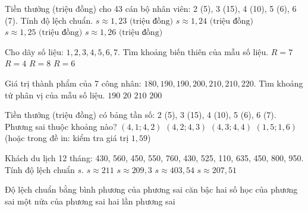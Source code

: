 \begin{ex}
	Tiền thưởng (triệu đồng) cho 43 cán bộ nhân viên: 2 (5), 3 (15), 4 (10), 5 (6), 6 (7). Tính độ lệch chuẩn.
	\choice
	{$s \approx 1{,}23\text{ (triệu đồng)}$}
	{$s \approx 1{,}24\text{ (triệu đồng)}$}
	{$s \approx 1{,}25\text{ (triệu đồng)}$}
	{\True $s \approx 1{,}26\text{ (triệu đồng)}$}
\end{ex}

\begin{ex}
	Cho dãy số liệu: $1, 2, 3, 4, 5, 6, 7$. Tìm khoảng biến thiên của mẫu số liệu.
	\choice
	{$R = 7$}
	{$R = 4$}
	{$R = 8$}
	{\True $R = 6$}
\end{ex}

\begin{ex}
	Giá trị thành phẩm của 7 công nhân: $180, 190, 190, 200, 210, 210, 220$. Tìm khoảng tứ phân vị của mẫu số liệu.
	\choice
	{$190$}
	{\True $20$}
	{$210$}
	{$200$}
\end{ex}

\begin{ex}
	Tiền thưởng (triệu đồng) có bảng tần số: 2 (5), 3 (15), 4 (10), 5 (6), 6 (7). Phương sai thuộc khoảng nào?
	\choice
	{$(4{,}1; 4{,}2)$}
	{$(4{,}2; 4{,}3)$}
	{$(4{,}3; 4{,}4)$}
	{\True $(1{,}5; 1{,}6)$ (hoặc trong đề in: kiểm tra giá trị $1{,}59$)}
\end{ex}

\begin{ex}
	Khách du lịch 12 tháng: 430, 560, 450, 550, 760, 430, 525, 110, 635, 450, 800, 950. Tính độ lệch chuẩn $s$.
	\choice
	{\True $s \approx 211$}
	{$s \approx 209{,}3$}
	{$s \approx 403{,}54$}
	{$s \approx 207{,}51$}
\end{ex}

\begin{ex}
	Độ lệch chuẩn bằng
	\choice
	{bình phương của phương sai}
	{\True căn bậc hai số học của phương sai}
	{một nửa của phương sai}
	{hai lần phương sai}
\end{ex}

